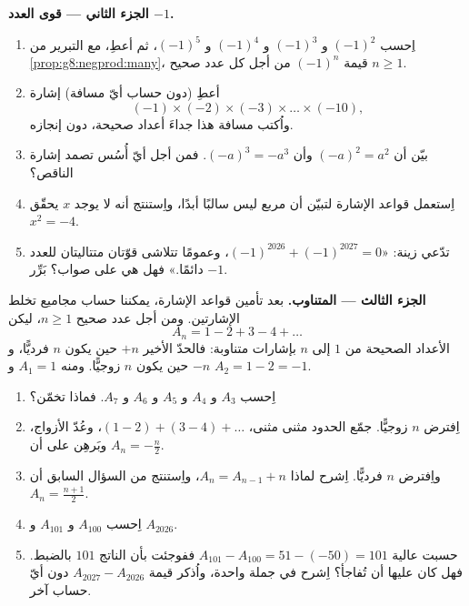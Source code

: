 \begin{problem}
\medskip
\noindent\textbf{الجزء الثاني --- قوى العدد $-1$.}
\begin{enumerate}[resume]
  \item اِحسب $(-1)^2$ و $(-1)^3$ و $(-1)^4$ و $(-1)^5$، ثم أعطِ،
        مع التبرير من \cref{prop:g8:negprod:many}،
        قيمة $(-1)^n$ من أجل كل عدد صحيح $n \geq 1$.
  \item أعطِ (دون حساب أيّ مسافة) إشارة
        \[
        (-1) \times (-2) \times (-3) \times \dots \times (-10),
        \]
        واُكتب مسافة هذا  جداءَ أعداد
        صحيحة، دون إنجازه.
  \item بيّن أن $(-a)^2 = a^2$ وأن $(-a)^3 = -a^3$. فمن أجل أيّ
        أُسُس تصمد إشارة الناقص؟
  \item اِستعمل قواعد الإشارة لتبيّن أن مربع  ليس سالبًا أبدًا، واِستنتج أنه لا يوجد 
        $x$ يحقّق $x^2 = -4$.
  \item تدّعي زينة: «$(-1)^{2026} + (-1)^{2027} = 0$، وعمومًا
        تتلاشى قوّتان متتاليتان للعدد $-1$ دائمًا.» فهل هي
        على صواب؟ بَرِّر.
\end{enumerate}

\medskip
\noindent\textbf{الجزء الثالث ---  المتناوب.}
بعد تأمين قواعد الإشارة، يمكننا حساب مجاميع تخلط
الإشارتين. ومن أجل عدد صحيح $n \geq 1$، ليكن
\[
A_n = 1 - 2 + 3 - 4 + \dots
\]
 الأعداد الصحيحة من $1$ إلى $n$ بإشارات
متناوبة: فالحدّ الأخير $+n$ حين يكون $n$ فرديًّا، و $-n$ حين يكون $n$
زوجيًّا. ومنه $A_1 = 1$ و $A_2 = 1 - 2 = -1$.
\begin{enumerate}[resume]
  \item اِحسب $A_3$ و $A_4$ و $A_5$ و $A_6$ و $A_7$. فماذا
        تخمّن؟
  \item اِفترض $n$ زوجيًّا. جمّع الحدود مثنى مثنى،
        $(1 - 2) + (3 - 4) + \dots$، وعُدّ الأزواج، وبَرهِن على أن
        $A_n = -\frac{n}{2}$.
  \item واِفترض $n$ فرديًّا. اِشرح لماذا $A_n = A_{n-1} + n$،
        واِستنتج من السؤال السابق أن
        $A_n = \frac{n + 1}{2}$.
  \item اِحسب $A_{100}$ و $A_{101}$ و $A_{2026}$.
  \item حسبت عالية $A_{101} - A_{100} = 51 - (-50) = 101$ ففوجئت
        بأن الناتج $101$ بالضبط. فهل كان عليها أن تُفاجأ؟
        اِشرح في جملة واحدة، واُذكر قيمة
        $A_{2027} - A_{2026}$ دون أيّ حساب آخر.
\end{enumerate}
\end{problem}
